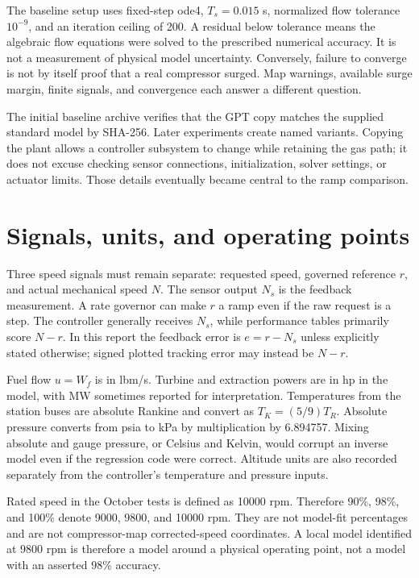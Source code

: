 The baseline setup uses fixed-step ode4, $T_s=0.015$ s, normalized flow tolerance $10^{-9}$, and an iteration ceiling of 200. A residual below tolerance means the algebraic flow equations were solved to the prescribed numerical accuracy. It is not a measurement of physical model uncertainty. Conversely, failure to converge is not by itself proof that a real compressor surged. Map warnings, available surge margin, finite signals, and convergence each answer a different question.

The initial baseline archive verifies that the GPT copy matches the supplied standard model by SHA-256. Later experiments create named variants. Copying the plant allows a controller subsystem to change while retaining the gas path; it does not excuse checking sensor connections, initialization, solver settings, or actuator limits. Those details eventually became central to the ramp comparison.

\section{Signals, units, and operating points}
Three speed signals must remain separate: requested speed, governed reference $r$, and actual mechanical speed $N$. The sensor output $N_s$ is the feedback measurement. A rate governor can make $r$ a ramp even if the raw request is a step. The controller generally receives $N_s$, while performance tables primarily score $N-r$. In this report the feedback error is $e=r-N_s$ unless explicitly stated otherwise; signed plotted tracking error may instead be $N-r$.

Fuel flow $u=W_f$ is in lbm/s. Turbine and extraction powers are in hp in the model, with MW sometimes reported for interpretation. Temperatures from the station buses are absolute Rankine and convert as $T_K=(5/9)T_R$. Absolute pressure converts from psia to kPa by multiplication by 6.894757. Mixing absolute and gauge pressure, or Celsius and Kelvin, would corrupt an inverse model even if the regression code were correct. Altitude units are also recorded separately from the controller's temperature and pressure inputs.

Rated speed in the October tests is defined as 10000 rpm. Therefore 90\%, 98\%, and 100\% denote 9000, 9800, and 10000 rpm. They are not model-fit percentages and are not compressor-map corrected-speed coordinates. A local model identified at 9800 rpm is therefore a model around a physical operating point, not a model with an asserted 98\% accuracy.

